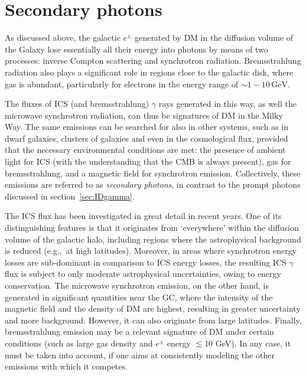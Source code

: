 \section{Secondary photons}\label{sec:secondary photons}
As discussed above, the galactic $e^\pm$ generated by DM in the diffusion volume of the Galaxy lose essentially all their energy into photons by means of two processes: inverse Compton scattering and synchrotron radiation. 
Bremsstrahlung radiation also plays a significant role in regions close to the galactic disk, where gas is abundant, particularly for electrons in the energy range of $\sim 1-10\,\text{GeV}$.


\smallskip

The fluxes of ICS (and bremsstrahlung) $\gamma$ rays generated in this way, as well the microwave synchrotron radiation, can thus be signatures of DM in the Milky Way. 
The same emissions can be searched for also in other systems, such as in dwarf galaxies, clusters of galaxies and even in the cosmological flux, 
provided that the necessary environmental conditions are met: the presence of ambient light for ICS (with the understanding that the CMB is always present), gas for bremsstrahlung, and a magnetic field for synchrotron emission.
Collectively, these emissions are referred to as \emph{secondary photons}, in contrast to the prompt photons discussed in section~\ref{sec:IDgamma}.

 
 \smallskip
 
The ICS flux has been investigated in great detail in recent years. One of its distinguishing features  is that it originates from `everywhere' within the diffusion volume of the galactic halo, including regions where the astrophysical background is reduced (e.g.,\ at high latitudes). 
Moreover, in areas where synchrotron energy losses are sub-dominant in comparison to ICS energy losses, the resulting ICS $\gamma$ flux is subject to only moderate astrophysical uncertainties, owing to energy conservation. 
The microwave synchrotron emission, on the other hand, is generated in significant quantities near the GC, where the intensity of the magnetic field and the density of DM are highest, resulting in greater uncertainty and more background.
However, it can also originate from large latitudes.
Finally, bremsstrahlung emission may be a relevant signature of DM under certain conditions (such as large gas density and $e^\pm$ energy $\lesssim$10 GeV).
In any case, it must be taken into account, if one aims at consistently modeling the other emissions with which it competes.

